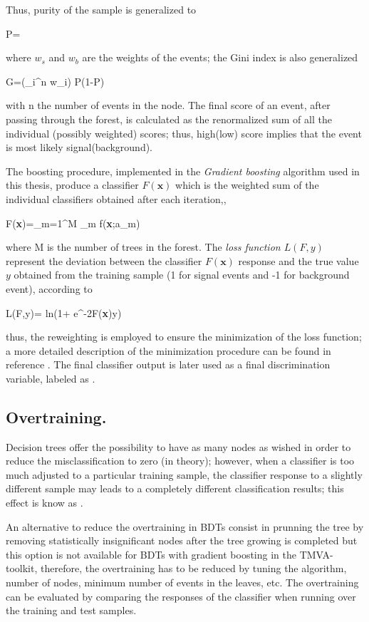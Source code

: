 Thus, purity of the sample is generalized to 

\beqn
P=
\eeqn

\noindent where $w_s$ and $w_b$ are the weights of the events; the Gini index is also generalized

\beqn
G=\left(\sum_i^n w_i\right) P(1-P)
\eeqn

\noindent with n the number of events in the node. The final score of an event, after passing through the forest, is calculated as the renormalized sum of all the individual (possibly weighted) scores; thus, high(low) score implies that the event is most likely signal(background).   

The boosting procedure, implemented in the  \textit{Gradient boosting} algorithm used in this thesis, produce a classifier $F(\textbf{x})$ which is the weighted sum of the individual classifiers obtained after each iteration,\ie,   

\beqn
F(\textbf{x})=\sum_{m=1}^M \beta_m f(\textbf{x};a_m)
\eeqn

\noindent where M is the number of trees in the forest. The \textit{loss function $L(F,y)$} represent the deviation between the classifier $F(\textbf{x})$ response and the true value $y$ obtained from the training sample (1 for signal events and -1 for background event), according to 

\beqn
L(F,y)= \textrm{ln}(1+ e^{-2F(\textbf{x})y})
\eeqn

\noindent thus, the reweighting is employed to ensure the minimization of the loss function; a more detailed description of the minimization procedure can be found in reference \cite{friedman}. The final classifier output is later used as a final discrimination variable, labeled as .

\subsection{Overtraining.}

Decision trees offer the possibility to have as many nodes as wished in order to reduce the misclassification to zero (in theory); however, when a classifier is too much adjusted to a particular training sample, the classifier response to a slightly different sample may leads to a completely different classification results; this effect is know as .

An alternative to reduce the overtraining in BDTs consist in prunning the tree by removing statistically insignificant nodes after the tree growing is completed but this option is not available for BDTs with gradient boosting in the TMVA-toolkit, therefore, the overtraining has to be reduced by tuning the algorithm, number of nodes, minimum number of events in the leaves, etc. The overtraining can be evaluated by comparing the responses of the classifier when running over the training and test samples.   

